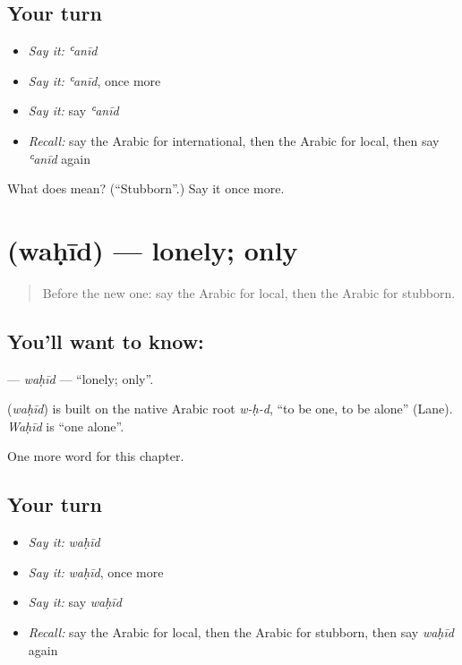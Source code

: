 \subsection*{Your turn}
\begin{itemize}
\raggedright
  \item \emph{Say it:} \emph{ʿanīd}
  \item \emph{Say it:} \emph{ʿanīd}, once more
  \item \emph{Say it:} say \emph{ʿanīd}
  \item \emph{Recall:} say the Arabic for international, then the Arabic for local, then say \emph{ʿanīd} again
\end{itemize}

\begin{tcolorbox}[breakable,colback=teal!4,colframe=teal!35!black,title={Before you move on}]
What does  mean? (\textquotedblleft{}Stubborn\textquotedblright{}.) Say it once more.
\end{tcolorbox}
\section[\texorpdfstring{\ar{وحيد} (waḥīd)}{وحيد (waḥīd)}]{ (waḥīd) — lonely; only}

\label{lesson:AR-C271-wahid}



\begin{quote}
Before the new one: say the Arabic for local, then the Arabic for stubborn.
\end{quote}

\subsection*{You'll want to know: }
\textbf{} — \emph{waḥīd} — \textquotedblleft{}lonely; only\textquotedblright{}.

\begin{cousinweb}
\textbf{} (\emph{waḥīd}) is built on the native Arabic root \emph{w-ḥ-d}, \textquotedblleft{}to be one, to be alone\textquotedblright{} (Lane). \emph{Waḥīd} is \textquotedblleft{}one alone\textquotedblright{}.
\end{cousinweb}

\begin{grammarlens}[title={What you've built}]
One more word for this chapter.
\end{grammarlens}

\subsection*{Your turn}
\begin{itemize}
\raggedright
  \item \emph{Say it:} \emph{waḥīd}
  \item \emph{Say it:} \emph{waḥīd}, once more
  \item \emph{Say it:} say \emph{waḥīd}
  \item \emph{Recall:} say the Arabic for local, then the Arabic for stubborn, then say \emph{waḥīd} again
\end{itemize}

